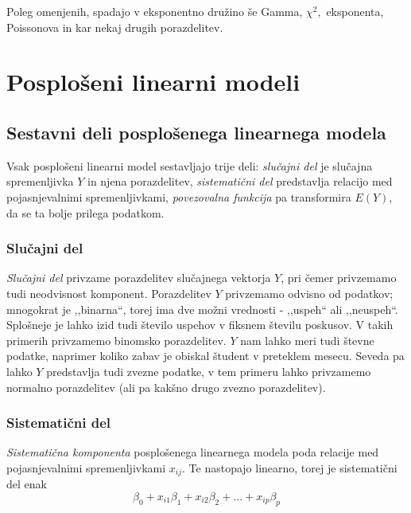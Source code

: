 \documentclass[12pt,a4paper]{amsart}
\theoremstyle{definition} %
\theoremstyle{plain} %
\begin{document}
Poleg omenjenih, spadajo v eksponentno družino še Gamma, $\chi^2,$ eksponenta, Poissonova in kar nekaj drugih porazdelitev.
\section{Posplošeni linearni modeli}

\subsection{Sestavni deli posplošenega linearnega modela}
Vsak posplošeni linearni model sestavljajo trije deli: \textit{slučajni del} je slučajna spremenljivka $Y$ in njena porazdelitev, 
\textit{sistematični del} predstavlja relacijo med pojasnjevalnimi spremenljivkami, \textit{povezovalna funkcija} pa transformira $E(Y)$, da se ta
bolje prilega podatkom.

\subsubsection{Slučajni del}
\textit{Slučajni del} privzame porazdelitev slučajnega vektorja $Y$, pri čemer privzemamo tudi neodvisnost komponent. Porazdelitev $Y$
privzemamo odvisno od podatkov; mnogokrat je ,,binarna``, torej ima dve možni vrednosti - ,,uspeh`` ali ,,neuspeh``. Splošneje je lahko izid tudi 
število uspehov v fiksnem številu poskusov. V takih primerih privzamemo binomsko porazdelitev. $Y$ nam lahko meri tudi števne podatke, naprimer 
koliko zabav je obiskal študent v preteklem mesecu. Seveda pa lahko $Y$ predstavlja tudi zvezne podatke,
v tem primeru lahko privzamemo normalno porazdelitev (ali pa kakšno drugo zvezno porazdelitev).
\subsubsection{Sistematični del} 
\textit{Sistematična komponenta} posplošenega linearnega modela poda relacije med pojasnjevalnimi spremenljivkami $x_{ij}$. Te nastopajo 
linearno, torej je sistematični del enak
\[
\beta_{0} + x_{i1}\beta_{1} + x_{i2}\beta_{2} + \ldots + x_{ip}\beta_{p}
\]
\end{document}
